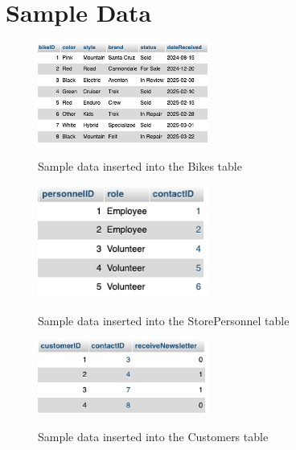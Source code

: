 \documentclass{article}
\begin{document}
\vspace{0.5cm}

\section{Sample Data}

\begin{figure}[H]
    \centering
    \caption{Sample data inserted into the Bikes table}
    \vspace{0.2cm}
    \includegraphics[width=0.5\textwidth]{Bikes.png}
    \label{fig:Bikes}
\end{figure}

\begin{figure}[H]
    \centering
    \caption{Sample data inserted into the StorePersonnel table}
    \vspace{0.2cm}
    \includegraphics[width=0.5\textwidth]{StorePersonnel.png}
    \label{fig:StorePersonnel}
\end{figure}

\begin{figure}[H]
    \centering
    \caption{Sample data inserted into the Customers table}
    \vspace{0.2cm}
    \includegraphics[width=0.5\textwidth]{Customers.png}
    \label{fig:Customers}
\end{figure}
\end{document}
